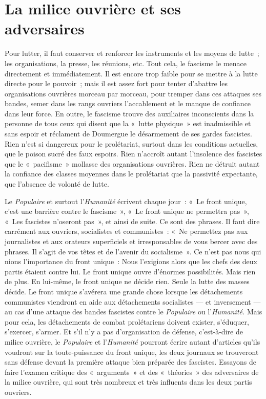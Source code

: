 \documentclass[french,twoside]{book} %
\begin{document}
\section[{La milice ouvrière et ses adversaires}]{La milice ouvrière et ses adversaires}
\noindent Pour lutter, il faut conserver et renforcer les instruments et les moyens de lutte ; les organisations, la presse, les réunions, etc. Tout cela, le fascisme le menace directement et immédiatement. Il est encore trop faible pour se mettre à la lutte directe pour le pouvoir ; mais il est assez fort pour tenter d’abattre les organisations ouvrières morceau par morceau, pour tremper dans ces attaques ses bandes, semer dans les rangs ouvriers l’accablement et le manque de confiance dans leur force. En outre, le fascisme trouve des auxiliaires inconscients dans la personne de tous ceux qui disent que la « lutte physique » est inadmissible et sans espoir et réclament de Doumergue le désarmement de ses gardes fascistes. Rien n’est si dangereux pour le prolétariat, surtout dans les conditions actuelles, que le poison sucré des faux espoirs. Rien n’accroît autant l’insolence des fascistes que le « pacifisme » mollasse des organisations ouvrières. Rien ne détruit autant la confiance des classes moyennes dans le  prolétariat que la passivité expectante, que l’absence de volonté de lutte.\par
Le \emph{Populaire} et surtout l’\emph{Humanité} écrivent chaque jour : « Le front unique, c’est une barrière contre le fascisme », « Le front unique ne permettra pas », « Les fascistes n’oseront pas », et ainsi de suite. Ce sont des phrases. Il faut dire carrément aux ouvriers, socialistes et communistes : « Ne permettez pas aux journalistes et aux orateurs superficiels et irresponsables de vous bercer avec des phrases. Il s’agit de vos têtes et de l’avenir du socialisme ». Ce n’est pas nous qui nions l’importance du front unique : Nous l’exigions alors que les chefs des deux partis étaient contre lui. Le front unique ouvre d’énormes possibilités. Mais rien de plus. En lui-même, le front unique ne décide rien. Seule la lutte des masses décide. Le front unique s’avérera une grande chose lorsque les détachements communistes viendront en aide aux détachements socialistes — et inversement — au cas d’une attaque des bandes fascistes contre le \emph{Populaire} ou l’\emph{Humanité.} Mais pour cela, les détachements de combat prolétariens doivent exister, s’éduquer, s’exercer, s’armer. Et s’il n’y a pas d’organisation de défense, c’est-à-dire de milice ouvrière, le \emph{Populaire} et l’\emph{Humanité} pourront écrire autant d’articles qu’ils voudront sur la toute-puissance du front unique, les deux journaux se trouveront sans défense devant la première attaque bien préparée des fascistes. Essayons de faire l’examen critique des « arguments » et des « théories » des adversaires de la milice ouvrière, qui sont très nombreux et très influents dans les deux partis ouvriers.\par
\end{document}
